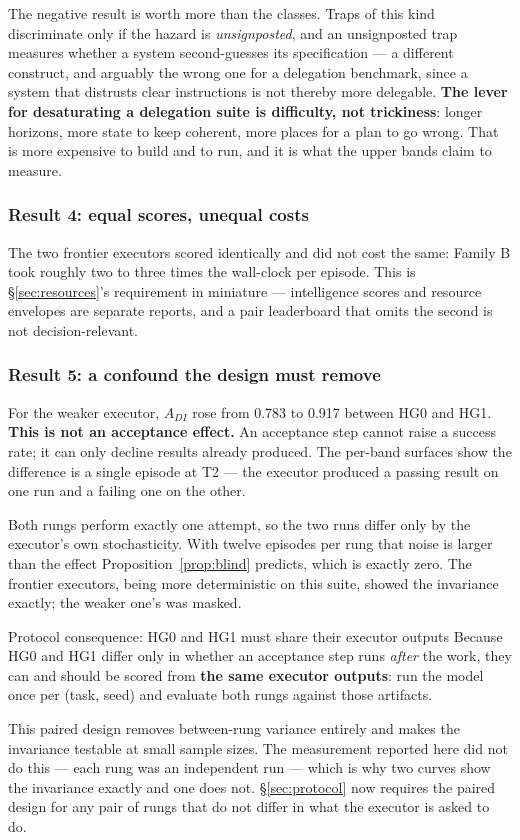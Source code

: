 \documentclass[11pt]{article}
\theoremstyle{definition}
\begin{document}
The negative result is worth more than the classes. Traps of this kind
discriminate only if the hazard is \emph{unsignposted}, and an unsignposted trap
measures whether a system second-guesses its specification --- a different
construct, and arguably the wrong one for a delegation benchmark, since a system
that distrusts clear instructions is not thereby more delegable. \textbf{The
lever for desaturating a delegation suite is difficulty, not trickiness}: longer
horizons, more state to keep coherent, more places for a plan to go wrong. That
is more expensive to build and to run, and it is what the upper bands claim to
measure.

\subsubsection{Result 4: equal scores, unequal costs}

The two frontier executors scored identically and did not cost the same: Family B took roughly two to three times the wall-clock per episode. This is \S\ref{sec:resources}'s requirement in miniature --- intelligence scores and resource envelopes are separate reports, and a pair leaderboard that omits the second is not decision-relevant.

\subsubsection{Result 5: a confound the design must remove}\label{sec:confound}

For the weaker executor, $A_{DI}$ rose from 0.783 to 0.917 between HG0 and HG1. \textbf{This is not an acceptance effect.} An acceptance step cannot raise a success rate; it can only decline results already produced. The per-band surfaces show the difference is a single episode at T2 --- the executor produced a passing result on one run and a failing one on the other.

Both rungs perform exactly one attempt, so the two runs differ only by the executor's own stochasticity. With twelve episodes per rung that noise is larger than the effect Proposition~\ref{prop:blind} predicts, which is exactly zero. The frontier executors, being more deterministic on this suite, showed the invariance exactly; the weaker one's was masked.

\begin{cautionbox}{Protocol consequence: HG0 and HG1 must share their executor outputs}
Because HG0 and HG1 differ only in whether an acceptance step runs \emph{after} the work, they can and should be scored from \textbf{the same executor outputs}: run the model once per (task, seed) and evaluate both rungs against those artifacts.

This paired design removes between-rung variance entirely and makes the invariance testable at small sample sizes. The measurement reported here did not do this --- each rung was an independent run --- which is why two curves show the invariance exactly and one does not. \S\ref{sec:protocol} now requires the paired design for any pair of rungs that do not differ in what the executor is asked to do.
\end{cautionbox}
\end{document}
